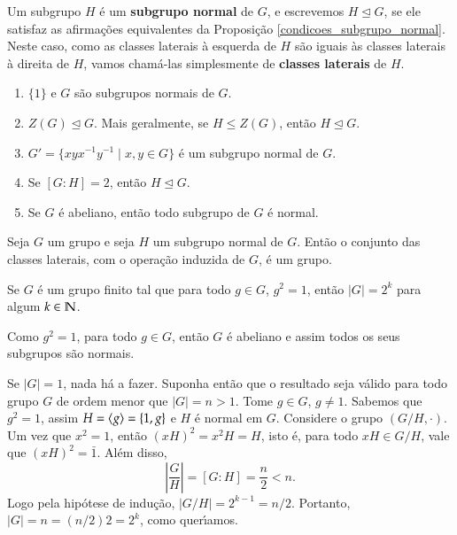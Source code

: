 \begin{definicao}
	Um subgrupo $H$ \'e um \textbf{subgrupo normal} de $G$, e escrevemos $H \unlhd G$, se ele satisfaz as afirma\c{c}\~oes equivalentes da Proposi\c{c}\~ao \ref{condicoes_subgrupo_normal}. Neste caso, como as classes laterais \`a esquerda de $H$ s\~ao iguais \`as classes laterais \`a direita de $H$, vamos cham\'a-las simplesmente de \textbf{classes laterais} de $H$.
\end{definicao}

\begin{exemplos}
	\begin{enumerate}[label=({\arabic*})]
		\item $\{1\}$ e $G$ s\~ao subgrupos normais de $G$.
		\item $Z(G) \unlhd G$. Mais geralmente, se $H \le Z(G)$, ent\~ao $H \unlhd G$.
		\item $G' = \{xyx^{-1}y^{-1} \mid x, y \in G\}$ \'e um subgrupo normal de $G$.
		\item Se $[G:H] = 2$, ent\~ao $H \unlhd G$.
		\item Se $G$ \'e abeliano, ent\~ao todo subgrupo de $G$ \'e normal.
	\end{enumerate}
\end{exemplos}

\begin{teorema}
	Seja $G$ um grupo e seja $H$ um subgrupo normal de $G$. Ent\~ao o conjunto das classes laterais, com o opera\c{c}\~ao induzida de $G$, \'e um grupo.
\end{teorema}

\begin{proposicao}\label{grupo_com_ordem_potencia_de_dois}
	Se $G$ \'e um grupo finito tal que para todo $g \in G$, $g^2 = 1$, ent\~ao $|G| = 2^k$ para algum $k \in \mathbb{N}$.
\end{proposicao}
\begin{prova}
	Como $g^2 = 1$, para todo $g \in G$, ent\~ao $G$ \'e abeliano e assim todos os seus subgrupos s\~ao normais.

	Se $|G| = 1$, nada h\'a a fazer. Suponha ent\~ao que o resultado seja v\'alido para todo grupo $G$ de ordem menor que $|G| = n > 1$. Tome $g \in G$, $g \ne 1$. Sabemos que $g^2 = 1$, assim $H = \langle{g}\rangle = \{1,g\}$ e $H$ \'e normal em $G$. Considere o grupo $(G/H,\cdot)$. Um vez que $x^2 = 1$, ent\~ao $(xH)^2 = x^2H = H$, isto \'e, para todo $xH \in G/H$, vale que $(xH)^2 = \bar{1}$. Al\'em disso,
	\[
		\left|\dfrac{G}{H}\right| = [G:H] = \dfrac{n}{2} < n.
	\]
	Logo pela hip\'otese de indu\c{c}\~ao, $|G/H| = 2^{k - 1} = n/2$. Portanto, $|G| = n = (n/2)2 = 2^k$, como quer{\'\i}amos.
\end{prova}

